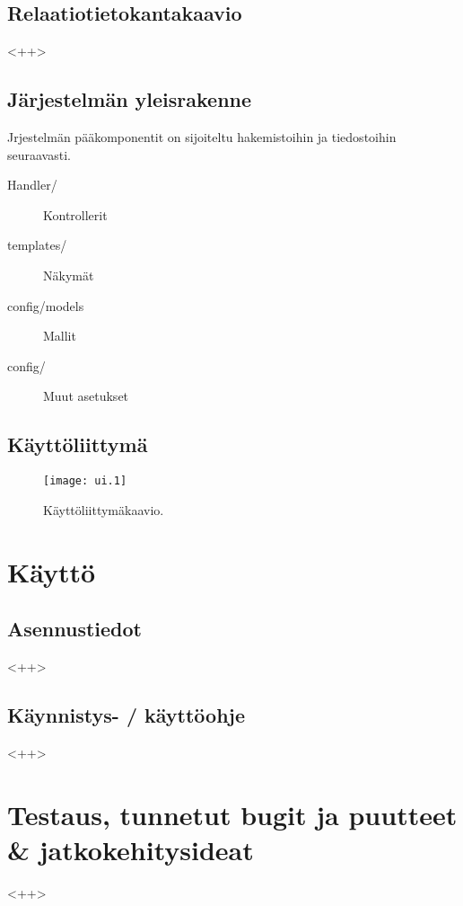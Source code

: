 \documentclass[a4paper,12pt]{report}
\begin{document}
\section{Relaatiotietokantakaavio}
<++>

\section{Järjestelmän yleisrakenne}
Jrjestelmän pääkomponentit on sijoiteltu hakemistoihin ja tiedostoihin
seuraavasti.
\begin{description}
   \item[Handler/]      Kontrollerit
   \item[templates/]    Näkymät
   \item[config/models] Mallit
   \item[config/]       Muut asetukset
\end{description}


\section{Käyttöliittymä}
\begin{figure}[ht]
   \centering \texttt{[image: ui.1]}
   \caption{Käyttöliittymäkaavio.
   }
   \label{graph_ui}
\end{figure}

\chapter{Käyttö}
\section{Asennustiedot} <++>
\section{Käynnistys- / käyttöohje} <++>

\chapter{Testaus, tunnetut bugit ja puutteet \& jatkokehitysideat} <++>


\end{document}
